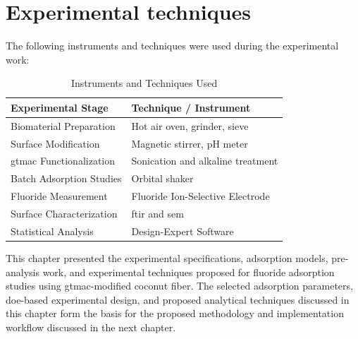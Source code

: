 \section{Experimental techniques }
The following instruments and techniques were used during the experimental work:

\begin{table}[h]
	\centering
	\caption{Instruments and Techniques Used}
	\label{tab:instruments}
	\begin{tabular}{|l|l|}
		\hline
		\textbf{Experimental Stage} & \textbf{Technique / Instrument} \\
		\hline
		Biomaterial Preparation & Hot air oven, grinder, sieve \\
		Surface Modification & Magnetic stirrer, pH meter \\
		\gls{gtmac} Functionalization & Sonication and alkaline treatment \\
		Batch Adsorption Studies & Orbital shaker \\
		Fluoride Measurement & Fluoride Ion-Selective Electrode \\
		Surface Characterization & \gls{ftir} and \gls{sem} \\
		Statistical Analysis & Design-Expert Software \\
		\hline
	\end{tabular}
\end{table}

This chapter presented the experimental specifications, adsorption models, pre-analysis 
work, and experimental techniques proposed for fluoride adsorption studies using 
\gls{gtmac}-modified coconut fiber. The selected adsorption parameters, \gls{doe}-based 
experimental design, and proposed analytical techniques discussed in this chapter form 
the basis for the proposed methodology and implementation workflow discussed in the 
next chapter.

%
%
